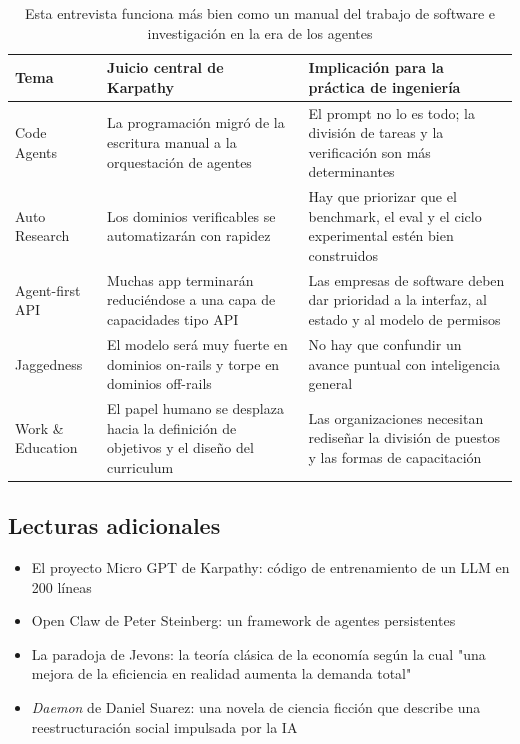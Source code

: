 \begin{table}[H]
\centering
\begin{tabular}{p{3.0cm}p{4.5cm}p{4.4cm}}
\toprule
\textbf{Tema} & \textbf{Juicio central de Karpathy} & \textbf{Implicación para la práctica de ingeniería} \\
\midrule
Code Agents & La programación migró de la escritura manual a la orquestación de agentes & El prompt no lo es todo; la división de tareas y la verificación son más determinantes \\
Auto Research & Los dominios verificables se automatizarán con rapidez & Hay que priorizar que el benchmark, el eval y el ciclo experimental estén bien construidos \\
Agent-first API & Muchas app terminarán reduciéndose a una capa de capacidades tipo API & Las empresas de software deben dar prioridad a la interfaz, al estado y al modelo de permisos \\
Jaggedness & El modelo será muy fuerte en dominios on-rails y torpe en dominios off-rails & No hay que confundir un avance puntual con inteligencia general \\
Work \& Education & El papel humano se desplaza hacia la definición de objetivos y el diseño del curriculum & Las organizaciones necesitan rediseñar la división de puestos y las formas de capacitación \\
\bottomrule
\end{tabular}
\caption{Esta entrevista funciona más bien como un manual del trabajo de software e investigación en la era de los agentes}
\end{table}

\subsection{Lecturas adicionales}

\begin{itemize}
    \item El proyecto Micro GPT de Karpathy: código de entrenamiento de un LLM en 200 líneas
    \item Open Claw de Peter Steinberg: un framework de agentes persistentes
    \item La paradoja de Jevons: la teoría clásica de la economía según la cual "una mejora de la eficiencia en realidad aumenta la demanda total"
    \item \textit{Daemon} de Daniel Suarez: una novela de ciencia ficción que describe una reestructuración social impulsada por la IA
\end{itemize}



